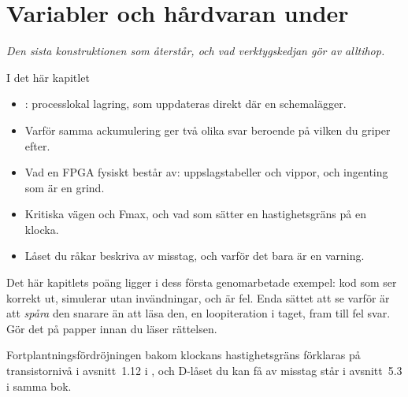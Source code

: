 
\chapter{Variabler och hårdvaran under}
\label{c5:ch}

{\large\itshape Den sista konstruktionen som återstår, och vad verktygskedjan gör av alltihop.\par}

\begin{chapterbox}{I det här kapitlet}
\begin{itemize}
  \item {}: processlokal lagring, som uppdateras direkt där en 
    schemalägger.
  \item Varför samma ackumulering ger två olika svar beroende på vilken du griper efter.
  \item Vad en FPGA fysiskt består av: uppslagstabeller och vippor, och ingenting som är en grind.
  \item Kritiska vägen och Fmax, och vad som sätter en hastighetsgräns på en klocka.
  \item Låset du råkar beskriva av misstag, och varför det bara är en varning.
\end{itemize}
\end{chapterbox}

Det här kapitlets poäng ligger i dess första genomarbetade exempel: kod som ser korrekt ut,
simulerar utan invändningar, och är fel. Enda sättet att se varför är att \emph{spåra} den snarare
än att läsa den, en loopiteration i taget, fram till fel svar. Gör det på papper innan du läser
rättelsen.

\note[Repetition] Fortplantningsfördröjningen bakom klockans hastighetsgräns förklaras på
transistornivå i avsnitt~1.12 i \debook{}, och D-låset du kan få av misstag står i avsnitt~5.3 i
samma bok.




